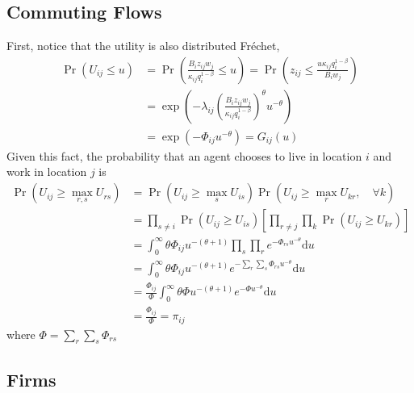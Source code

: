 \documentclass[12pt]{article}
\begin{document}
\subsection{Commuting Flows}
First, notice that the utility is also distributed Fréchet, 
\begin{align*}
    \Pr\left(U_{ij}\leq u\right) &= \Pr\left(\frac{B_iz_{ij}w_j}{\kappa_{ij}q_{i}^{1-\beta}}\leq u\right) 
    = \Pr\left( z_{ij}\leq \frac{u\kappa_{ij}q_i^{1-\beta}}{B_iw_j}\right) \\ 
    &= \exp\left(-\lambda_{ij}\left(\frac{B_iz_{ij}w_j}{\kappa_{ij}q_{i}^{1-\beta}}\right)^\theta u^{-\theta}\right) \\ 
    &= \exp\left(-\Phi_{ij}u^{-\theta}\right) = G_{ij}(u)
\end{align*}
Given this fact, the probability that an agent chooses to live in location $i$ and work in location $j$ is 
\begin{align*}
    \Pr\left(U_{ij}\geq \max_{r,s} U_{rs}\right) &= \Pr\left(U_{ij}\geq \max_{s} U_{is}\right)\Pr\left(U_{ij}\geq \max_{r} U_{kr},\quad\forall k\right) \\ 
    &= \prod_{s\neq i}\Pr\left( U_{ij}\geq U_{is}\right)\left[\prod_{r\neq j}\prod_{k}\Pr\left(U_{ij}\geq U_{kr}\right)\right] \\
    &= \int_0^{\infty}\theta\Phi_{ij}u^{-(\theta+1)}\prod_{s}\prod_{r}e^{-\Phi_{rs}u^{-\theta}} \mathrm{d}u \\ 
    &= \int_0^{\infty}\theta\Phi_{ij}u^{-(\theta+1)}e^{-\sum_{r}\sum_{s}\Phi_{rs}u^{-\theta}} \mathrm{d}u \\ 
    &= \frac{\Phi_{ij}}{\Phi}\int_0^{\infty}\theta\Phi u^{-(\theta+1)}e^{-\Phi u^{-\theta}} \mathrm{d}u \\ 
    &= \frac{\Phi_{ij}}{\Phi} = \pi_{ij}
\end{align*}
where $\Phi=\sum_{r}\sum_{s}\Phi_{rs}$

\subsection{Firms}
\end{document}
